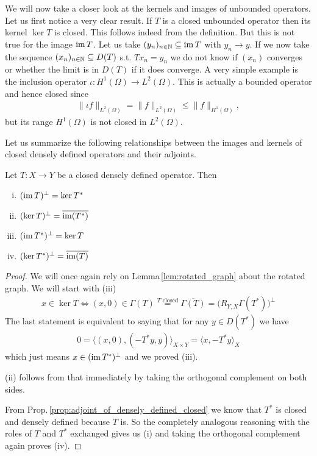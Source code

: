 \documentclass[../master_thesis.tex]{subfiles}
\begin{document}
We will now take a closer look at the kernels and images of unbounded operators.
Let us first notice a very clear result. If $T$ is a closed unbounded operator 
then its kernel $\ker T$ is closed. This follows indeed from the definition. 
But this is not true for the image $\operatorname{im} T$. Let us take
$(y_n)_{n \in \mathbb{N}} \subseteq \operatorname{im} T$ with $y_n \rightarrow y$.
If we now take the sequence $(x_n)_{n \in \mathbb{N}} \subseteq D(T)$
s.t. $Tx_n = y_n$ we do not know if $(x_n)$ converges or 
whether the limit is in $D(T)$ if it does converge. 
A very simple example is the inclusion operator
$\iota: H^1(\Omega) \rightarrow L^2(\Omega)$. This is actually a bounded 
operator and hence closed since 
\begin{align*}
    \lVert \iota f \rVert _{L^2(\Omega)} 
    = \lVert f \rVert _{L^2(\Omega)} 
    \leq \lVert f \rVert _{H^1(\Omega)},
\end{align*}
but its range $H^1(\Omega)$ is not closed in $L^2(\Omega)$.

Let us summarize the following relationships between the images and kernels 
of closed densely defined operators and their adjoints.

\begin{proposition}\label{prop:kernel_image_adjoint}
    Let $T: X \rightarrow Y$ be a closed densely defined operator. Then
    \begin{enumerate}[(i)]
        \item $(\operatorname{im} T)^\perp = \ker T^*$
        \item $(\ker T)^\perp = \overline{\operatorname{im}(T^*)}$
        \item $(\operatorname{im} T^*)^\perp = \ker T$
        \item $(\ker T^*)^\perp = \overline{\operatorname{im}(T)}$
    \end{enumerate}
\end{proposition}
\begin{proof}
    We will once again rely on Lemma\,\ref{lem:rotated_graph} about the 
    rotated graph. We will start with (iii)
    \begin{align*}
        x \in \ker T \Leftrightarrow (x,0) \in \Gamma(T) 
        \stackrel{\text{$T$ closed}}{=} \overline{\Gamma(T)} 
        = \big( R_{Y,X}\Gamma(T^*) \big)^\perp 
    \end{align*}
    The last statement is equivalent to saying that for any $y \in D(T^*)$ 
    we have 
    \begin{align*}
        0 = \langle (x,0), (-T^*y,y) \rangle_{X \times Y}
        = \langle x, -T^*y \rangle_X
    \end{align*}
    which just means $x \in (\operatorname{im} T^*)^\perp$ and we proved (iii).

    (ii) follows from that immediately by taking the orthogonal complement 
    on both sides.

    From Prop.\,\ref{prop:adjoint_of_densely_defined_closed} 
    we know that $T^*$ is closed and densely defined because $T$
    is. So the completely analogous reasoning with the roles of $T$ and $T^*$
    exchanged gives us (i) and taking the orthogonal complement again 
    proves (iv).
\end{proof}
\end{document}
